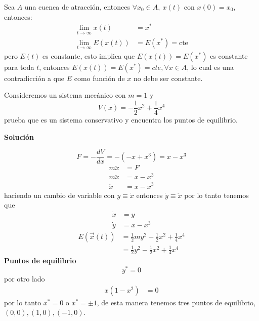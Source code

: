 Sea  $A$ una cuenca de atracción, entonces  $\forall x_0 \in A,\ x(t)$ con  $x(0)=x_0$, entonces:
\begin{align*}
  \lim_{t \to \infty} x(t) &= x^* \\
  \lim_{t \to \infty} E(x(t)) &= E(x^*) = \text{cte}
\end{align*}
pero $E(t)$ es constante, esto implica que  $E(x(t))=E(x^*)$ es constante para toda $t$, entonces  $E(x(t))=E(x^*)=cte, \forall x \in A$, lo cual es una contradicción a que $E$ como función de  $x$ no debe ser constante.

\begin{ejemplo}Consideremos un sistema mecánico con $m=1$ y  \begin{equation*}
	V(x) = -\frac{1}{2}x^2+\frac{1}{4}x^{4} 
\end{equation*}
prueba que es un sistema conservativo y encuentra los puntos de equilibrio.
	
\textbf{Solución}

\begin{equation*}
  F=-\frac{dV}{dx} = - (-x+x^3)=x-x^3 
\end{equation*}
\begin{align*}
  m \ddot{x} &= F \\
  m \ddot{x}&= x-x^3 \\
  \ddot{x} &= x-x^3
\end{align*}
haciendo un cambio de variable con $y \equiv \dot{x}$ entonces $\dot{y} \equiv \ddot{x}$ por lo tanto tenemos que
\begin{equation}
  \label{scr-eq1} 
  \begin{split}
    \dot{x} &= y \\
    \dot{y}&=x-x^3 
  \end{split}
\end{equation}
\begin{equation*}
  \begin{split}
    E(\vec{x}(t))&=\frac{1}{2}my^2-\frac{1}{2}x^2+\frac{1}{4}x^{4} \\
                 &=\frac{1}{2}y^2-\frac{1}{2}x^2+\frac{1}{4}x^{4}  
  \end{split}
\end{equation*}
\textbf{Puntos de equilibrio}
\begin{equation*}
  y^*=0 
\end{equation*}
por otro lado
\begin{align*}
  x(1-x^2) &= 0 
\end{align*}
por lo tanto $x^*=0$ o $x^*=\pm 1$, de esta manera tenemos tres puntos de equilibrio, $(0,0), (1,0), (-1,0)$.
\end{ejemplo}

